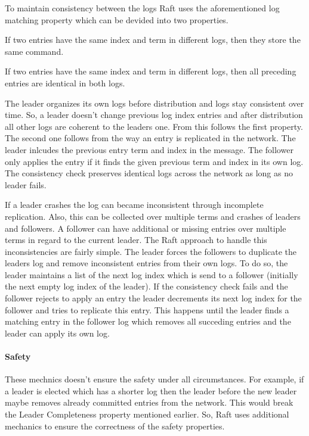 To maintain consistency between the logs Raft uses the aforementioned
log matching property which can be devided into two properties.

\begin{defi}
  If two entries have the same index and term in different logs, then
  they store the same command.
\end{defi}

\begin{defi}
  If two entries have the same index and term in different logs, then
  all preceding entries are identical in both logs.
\end{defi}

The leader organizes its own logs before distribution and logs stay
consistent over time. So, a leader doesn't change previous log index
entries and after distribution all other logs are coherent to the leaders
one. From this follows the first property. The second one follows
from the way an entry is replicated in the network. The leader
inlcudes the previous entry term and index in the message. The follower only
applies the entry if it finds the given previous term and index in its
own log. The consistency check preserves identical logs across the
network as long as no leader fails.~\cite{ongaro2014search}

If a leader crashes the log can became inconsistent through incomplete
replication. Also, this can be collected over multiple terms and
crashes of leaders and followers. A follower can have additional
or missing entries over multiple terms in regard to the current leader.
The Raft approach to handle this inconsistencies are fairly simple.
The leader forces the followers to duplicate the leaders log and
remove inconsistent entries from their own logs. 
To do so, the leader maintains a list of the next log index
which is send to a follower (initially the next empty log index of the leader). 
If the consistency check fails and the follower rejects to apply
an entry the leader decrements its next log index for the follower
and tries to replicate this entry. This happens until the leader
finds a matching entry in the follower log which removes all
succeding entries and the leader can apply its own log.~\cite{ongaro2014search}

\paragraph{Safety}
These mechnics doesn't ensure the safety under all circumstances.
For example, if a leader is elected which has a shorter log
then the leader before the new leader maybe removes already
committed entries from the network. This would break the
Leader Completeness property mentioned earlier. So, Raft
uses additional mechanics to ensure the correctness of
the safety properties.~\cite{ongaro2014search}

